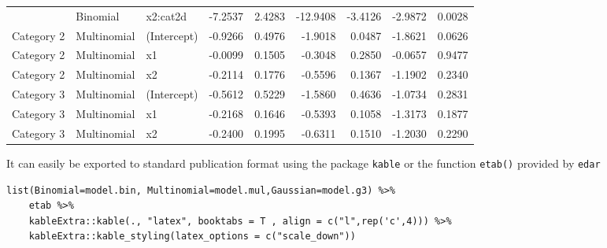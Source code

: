 \documentclass[a4paper]{article}
\begin{document}
\begin{table}[H]
{\begin{tabular}{lllrrrrrr}
 & Binomial & x2:cat2d & -7.2537 & 2.4283 & -12.9408 & -3.4126 & -2.9872 & 0.0028\\
\addlinespace
Category 2 & Multinomial & (Intercept) & -0.9266 & 0.4976 & -1.9018 & 0.0487 & -1.8621 & 0.0626\\
Category 2 & Multinomial & x1 & -0.0099 & 0.1505 & -0.3048 & 0.2850 & -0.0657 & 0.9477\\
Category 2 & Multinomial & x2 & -0.2114 & 0.1776 & -0.5596 & 0.1367 & -1.1902 & 0.2340\\
Category 3 & Multinomial & (Intercept) & -0.5612 & 0.5229 & -1.5860 & 0.4636 & -1.0734 & 0.2831\\
Category 3 & Multinomial & x1 & -0.2168 & 0.1646 & -0.5393 & 0.1058 & -1.3173 & 0.1877\\
Category 3 & Multinomial & x2 & -0.2400 & 0.1995 & -0.6311 & 0.1510 & -1.2030 & 0.2290\\
\bottomrule
\end{tabular}}
\end{table}



It can easily be exported to standard publication format using the package \texttt{kable} or the function \texttt{etab()} provided by \texttt{edar}

\lstset{numbers=left,language=r,label= ,caption= ,captionpos=b}
\begin{lstlisting}
list(Binomial=model.bin, Multinomial=model.mul,Gaussian=model.g3) %>%
    etab %>%
    kableExtra::kable(., "latex", booktabs = T , align = c("l",rep('c',4))) %>%
    kableExtra::kable_styling(latex_options = c("scale_down"))
\end{lstlisting}
\end{document}
